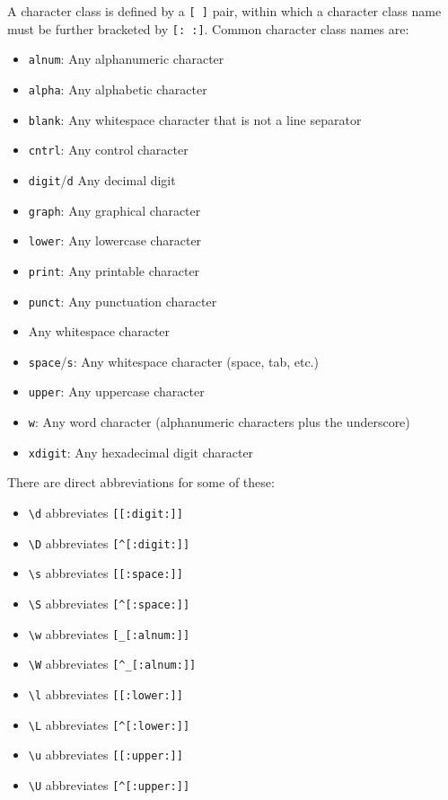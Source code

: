 \documentclass[8pt, table, xcdraw]{article}%
\begin{document}
A character class is defined by a \lstinline{[ ]} pair, within which a character class name must be further bracketed by \lstinline{[: :]}. Common character class names are:

\begin{itemize}
    \item \lstinline{alnum}: Any alphanumeric character
    \item \lstinline{alpha}: Any alphabetic character
    \item \lstinline{blank}: Any whitespace character that is not a line separator
    \item \lstinline{cntrl}: Any control character
    \item \lstinline{digit}/\lstinline{d} Any decimal digit
    \item \lstinline{graph}: Any graphical character
    \item \lstinline{lower}: Any lowercase character
    \item \lstinline{print}: Any printable character
    \item \lstinline{punct}: Any punctuation character
    \item  Any whitespace character
    \item \lstinline{space}/\lstinline{s}: Any whitespace character (space, tab, etc.)
    \item \lstinline{upper}: Any uppercase character
    \item \lstinline{w}: Any word character (alphanumeric characters plus the underscore)
    \item \lstinline{xdigit}: Any hexadecimal digit character
\end{itemize}

There are direct abbreviations for some of these:

\begin{itemize}
    \item \lstinline{\d} abbreviates \lstinline{[[:digit:]]}
    \item \lstinline{\D} abbreviates \lstinline{[^[:digit:]]}
    \item \lstinline{\s} abbreviates \lstinline{[[:space:]]}
    \item \lstinline{\S}  abbreviates \lstinline{[^[:space:]]}
    \item \lstinline{\w} abbreviates \lstinline{[_[:alnum:]]}
    \item \lstinline{\W} abbreviates \lstinline{[^_[:alnum:]]}
    \item \lstinline{\l} abbreviates \lstinline{[[:lower:]]}
    \item \lstinline{\L} abbreviates \lstinline{[^[:lower:]]}
    \item \lstinline{\u} abbreviates \lstinline{[[:upper:]]}
    \item \lstinline{\U} abbreviates \lstinline{[^[:upper:]]}
\end{itemize}
\end{document}
